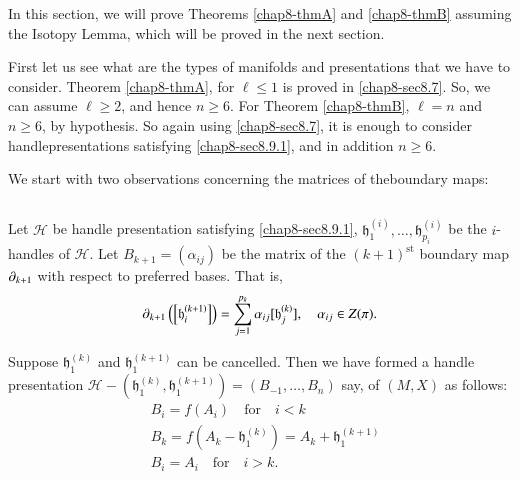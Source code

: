 In this section, we will prove Theorems \ref{chap8-thmA} and \ref{chap8-thmB} assuming the Isotopy Lemma, which will be proved in the next section.

First let us see what are the types of manifolds and presentations that we have to consider. Theorem \ref{chap8-thmA}, for $\ell\leq 1$ is proved in \ref{chap8-sec8.7}. So, we can assume $\ell\geq 2$, and hence $n\geq 6$. For Theorem \ref{chap8-thmB}, $\ell=n$ and $n\geq 6$, by hypothesis. So again using \ref{chap8-sec8.7}, it is enough to consider handle\pageoriginale presentations satisfying \ref{chap8-sec8.9.1}, and in addition $n\geq 6$.

We start with two observations concerning the matrices of the\break boundary maps:

\subsection{}\label{chap8-sec8.10.1}
Let $\mathscr{H}$ be handle presentation satisfying \ref{chap8-sec8.9.1}, $\mathfrak{h}^{(i)}_{1},\ldots,\mathfrak{h}^{(i)}_{p_{i}}$ be the $i$-handles of $\mathscr{H}$. Let $B_{k+1}=(\alpha_{ij})$ be the matrix of the $(k+1)^{\text{st}}$ boundary map $\partial_{k+1}$ with respect to preferred bases. That is, 
$$
\partial_{k+1}\left(\left[\mathfrak{h}^{(k+1)}_{i}\right]\right)=\sum^{p_{k}}_{j=1}\alpha_{ij}[\mathfrak{h}^{(k)}_{j}],\quad\alpha_{ij}\in Z(\pi).
$$

Suppose $\mathfrak{h}^{(k)}_{1}$ and $\mathfrak{h}^{(k+1)}_{1}$ can be cancelled. Then we have formed a handle presentation $\mathscr{H}-(\mathfrak{h}^{(k)}_{1},\mathfrak{h}^{(k+1)}_{1})=(B_{-1},\ldots,B_{n})$ say, of $(M,X)$ as follows:
\begin{align*}
& B_{i}=f(A_{i})\quad\text{for}\quad i<k\\
& B_{k}=f(A_{k}-\mathfrak{h}^{(k)}_{1})=A_{k}+\mathfrak{h}_{1}^{(k+1)}\\
& B_{i}=A_{i}\quad\text{for}\quad i>k.
\end{align*}

